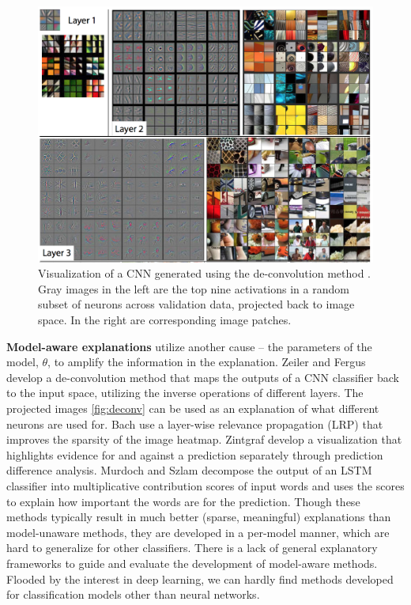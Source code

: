 

\begin{figure}[tb]
  \centering
  \includegraphics[width=1.0\textwidth]{figure/deconv}
  \caption{Visualization of a CNN generated using the de-convolution method \cite{zeiler2014eccv}. Gray images in the left are the top nine activations in a random subset of neurons across validation data, projected back to image space. In the right are corresponding image patches.}
  \label{fig:deconv}
\end{figure}

\textbf{Model-aware explanations} utilize another cause -- the parameters of the model, $\theta$, to amplify the information in the explanation. Zeiler and Fergus \cite{zeiler2014eccv} develop a de-convolution method that maps the outputs of a CNN classifier back to the input space, utilizing the inverse operations of different layers. The projected images \autoref{fig:deconv} can be used as an explanation of what different neurons are used for. Bach \etal \cite{bach15plos} use a layer-wise relevance propagation (LRP) that improves the sparsity of the image heatmap. Zintgraf \etal \cite{zintgraf17visualize} develop a visualization that highlights evidence for and against a prediction separately through prediction difference analysis. Murdoch and Szlam \cite{murdoch2017rule} decompose the output of an LSTM classifier into multiplicative contribution scores of input words and uses the scores to explain how important the words are for the prediction. Though these methods typically result in much better (sparse, meaningful) explanations than model-unaware methods, they are developed in a per-model manner, which are hard to generalize for other classifiers. There is a lack of general explanatory frameworks to guide and evaluate the development of model-aware methods. Flooded by the interest in deep learning, we can hardly find methods developed for classification models other than neural networks.

